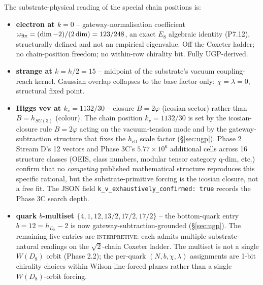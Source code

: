 ﻿\documentclass[reprint,amsmath,amssymb,aps,prd,longbibliography,floatfix]{revtex4-2}
\begin{document}
The substrate-physical reading of the special chain positions is:
\begin{itemize}
\item \textbf{electron at $k = 0$} -- gateway-normalisation
coefficient $\omega_{\rm fix} = (\dim - 2)/(2\dim) = 123/248$, an
exact $E_8$ algebraic identity (P7.12), structurally defined and not
an empirical eigenvalue. Off the Coxeter ladder; no chain-position
freedom; no within-row chirality bit. Fully UGP-derived.
\item \textbf{strange at $k = h/2 = 15$} -- midpoint of the substrate's
vacuum coupling-reach kernel. Gaussian overlap collapses to the base
factor only; $\chi = \lambda = 0$, structural fixed point.
\item \textbf{Higgs vev at $k_v = 1132/30$} -- closure $B = 2\varphi$
(icosian sector) rather than $B = h_{SU(3)}$ (colour). The chain
position $k_v = 1132/30$ is set by the icosian-closure rule
$B = 2\varphi$ acting on the vacuum-tension mode and by the
gateway-subtraction structure that fixes the $h_\mathrm{eff}$ scale
factor (\S\ref{sec:ugp}). Phase 2 Stream D's 12 vectors and Phase 3C's
$5.77 \times 10^{6}$ additional cells across 16 structure classes
(OEIS, class numbers, modular tensor category q-dim, etc.) confirm
that no \emph{competing} published mathematical structure reproduces
this specific rational, but the substrate-primitive forcing is the
icosian closure, not a free fit. The JSON field
\texttt{k\_v\_exhaustively\_confirmed: true} records the Phase 3C
search depth.
\item \textbf{quark $b$-multiset $\{4, 1, 12, 13/2, 17/2, 17/2\}$} --
the bottom-quark entry $b = 12 = h_{D_8} - 2$ is now
gateway-subtraction-grounded (\S\ref{sec:ugp}). The remaining five
entries are \textsc{interpretive}: each admits multiple
substrate-natural readings on the $\sqrt{2}$-chain Coxeter ladder.
The multiset is not a single $W(D_8)$ orbit (Phase 2.2); the per-quark
$(N, b, \chi, \lambda)$ assignments are 1-bit chirality choices within
Wilson-line-forced planes rather than a single $W(D_8)$-orbit forcing.
\end{itemize}
\end{document}
